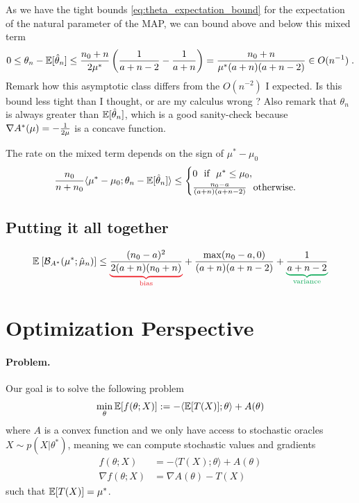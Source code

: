 \documentclass{article}
\newcommand*{\expect}[2][]{\ensuremath{\mathbb{E}_{#1} \left[ #2 \right] }} %
\newcommand{\logpart}{A}
\newcommand{\conj}{\logpart^*}
\newcommand{\bregmanconj}{\cB_{\logpart^*}}
\newcommand{\natp}{\theta}
\newcommand{\MAPt}{\hat \natp_n}
\begin{document}
\begin{example}
	As we have the tight bounds \eqref{eq:theta_expectation_bound} for the expectation of the natural parameter of the MAP, we can bound above and below this mixed term
	\begin{align}
		0
		\leq \natp_n - \E[\MAPt]
		\leq \frac{n_0 +n}{2 \mu^*} \left ( \inv{a+n-2} - \inv{a+n} \right)
		 = \frac{n_0+n}{\mu^*(a+n)(a+n-2)}	 \in O(n^{-1}) \; .
	\end{align} 
	Remark how this asymptotic class differs from the $O(n^{-2})$ I expected. Is this bound less tight than I thought, or are my calculus wrong ? 
	Also remark that $\natp_n$ is always greater than $\E[\MAPt]$, which is a good sanity-check because $\nabla \conj(\mu) = - \inv{2\mu}$ is a concave function.

	The rate on the mixed term depends on the sign of $\mu^* - \mu_0 $
	\begin{align}
		\frac{n_0}{n+n_0} \langle  \mu^* - \mu_0 ; \natp_n - \E[\hat \natp_n] \rangle
		\leq \begin{cases}
			0 \ \text{ if } \ \mu^*\leq \mu_0, \\
			\frac{n_0 - a}{(a+n)(a+n-2)} \ \text{ otherwise.}
		\end{cases}
	\end{align}
\end{example}


\subsection{Putting it all together}
\begin{example}
\begin{align}
	\expect{\bregmanconj(\mu^* ; \hat \mu_n)} 
	\leq \bias{\frac{(n_0-a)^2}{2(a+n)(n_0+n)}}
	+ \frac{\max(n_0 - a , 0)}{(a+n)(a+n-2)}
	+ \variance{\frac{1}{a+n-2}}
\end{align}
\end{example}


\section{Optimization Perspective}
\paragraph{Problem.}
Our goal is to solve the following problem
\begin{align}
	\min_\natp \E[f(\natp ; X)] := -\langle \E[T(X)] ; \natp \rangle + \logpart(\natp)
\end{align}
where $\logpart$ is a convex function and we only have access to stochastic oracles $X \sim p(X | \natp^*)$, meaning we can compute stochastic values and gradients 
\begin{align}
	f(\natp ; X) &= -\langle T(X) ; \natp \rangle + \logpart(\natp) \\
	\nabla f(\natp ; X) &= \nabla \logpart(\natp) - T(X)
\end{align}
such that $\operatorname{\mathbb{E}}[T(X)] = \mu^*$.
\end{document}
